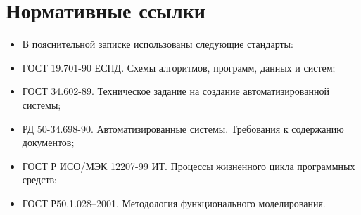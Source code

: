 {
	\titleformat{\section}[block]{\centering\normalfont\large\bfseries}{\thesection}{10pt}{}
	\section*{\centering Нормативные ссылки}
}

\begin{itemize}

	\item В пояснительной записке использованы следующие стандарты: 

	\item ГОСТ 19.701-90 ЕСПД. Схемы алгоритмов, программ, данных и систем;

	\item ГОСТ 34.602-89.  Техническое задание на создание автоматизированной системы;


	\item РД 50-34.698-90. Автоматизированные системы. Требования к содержанию документов;

	\item ГОСТ Р ИСО/МЭК 12207-99 ИТ. Процессы жизненного цикла программных средств;

	\item ГОСТ Р50.1.028–2001. Методология функционального моделирования.

\end{itemize}

\pagebreak